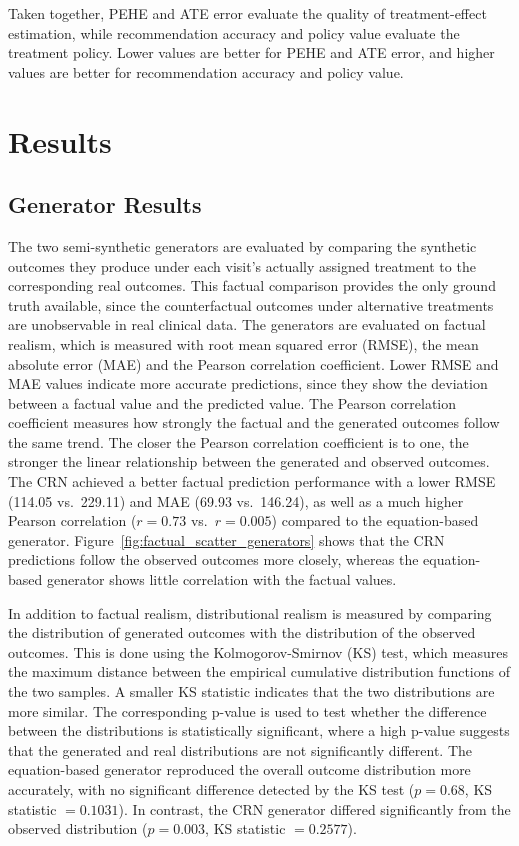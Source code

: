 \documentclass{article}
\begin{document}
Taken together, PEHE and ATE error evaluate the quality of treatment-effect estimation, while recommendation accuracy and policy value evaluate the treatment policy. Lower values are better for PEHE and ATE error, and higher values are better for recommendation accuracy and policy value.

\section{Results}
\subsection{Generator Results}
The two semi-synthetic generators are evaluated by comparing the synthetic outcomes they produce under each visit's actually assigned treatment to the corresponding real outcomes. This factual comparison provides the only ground truth available, since the counterfactual outcomes under alternative treatments are unobservable in real clinical data.
The generators are evaluated on factual realism, which is measured with root mean squared error (RMSE), the mean absolute error (MAE) and the Pearson correlation coefficient. Lower RMSE and MAE values indicate more accurate predictions, since they show the deviation between a factual value and the predicted value. The Pearson correlation coefficient measures how strongly the factual and the generated outcomes follow the same trend. The closer the Pearson correlation coefficient is to one, the stronger the linear relationship between the generated and observed outcomes.
The CRN achieved a better factual prediction performance with a lower RMSE (114.05 vs.\ 229.11) and MAE
(69.93 vs.\ 146.24), as well as a much higher Pearson correlation
($r = 0.73$ vs.\ $r = 0.005$) compared to the equation-based generator.
Figure~\ref{fig:factual_scatter_generators} shows that the CRN predictions follow the observed outcomes more closely, whereas the equation-based generator shows little correlation with the factual values.

In addition to factual realism, distributional realism is measured by comparing the distribution of generated outcomes with the distribution of the observed outcomes. This is done using the Kolmogorov-Smirnov (KS) test, which measures the maximum distance between the empirical cumulative distribution functions of the two samples. A smaller KS statistic indicates that the two distributions are more similar. The corresponding p-value is used to test whether the difference between the distributions is statistically significant, where a high p-value suggests that the generated and real distributions are not significantly different.
The equation-based generator reproduced the overall outcome
distribution more accurately, with no significant difference detected
by the KS test ($p = 0.68$, KS statistic $= 0.1031$). In contrast, the CRN generator differed
significantly from the observed distribution ($p = 0.003$, KS statistic $= 0.2577$).
\end{document}
